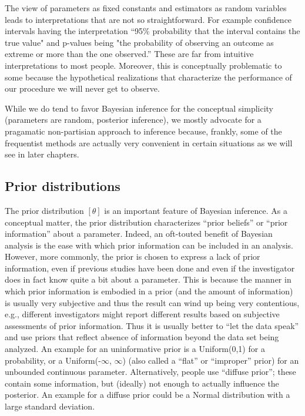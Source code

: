 The view of parameters as fixed constants and estimators as random variables
leads to interpretations that are not so straightforward. For
example confidence intervals having the interpretation ``95\%
probability that the interval contains the true value" and p-values
being "the probability of observing an outcome as extreme or more than
the one observed.'' These are far from intuitive interpretations to
most people.  Moreover, this is conceptually problematic to some
because the hypothetical realizations that characterize the
performance of our procedure we will never get to observe.

While we do tend to favor Bayesian inference for the conceptual
simplicity (parameters are random, posterior inference), we mostly
advocate for a pragamatic non-partisian approach to inference because,
frankly, some of the frequentist methods are actually very
convenient in certain situations as we will see in later chapters.


\subsection{Prior distributions}

The prior distribution $[\theta]$ is an important feature of Bayesian
inference. As a conceptual matter,
the prior distribution characterizes ``prior beliefs'' or ``prior
information'' about a parameter. Indeed,
an oft-touted benefit of Bayesian analysis is the ease with which
prior information can be included in an analysis. 
However, more commonly, the prior is chosen to
express a lack of prior information, even if previous studies have
been done and even if the investigator does in fact know quite a bit
about a parameter.
This is because
the manner in which prior information is embodied in a prior (and the
amount of information) is
usually very subjective and thus the result can wind up being very
contentious, e.g., different investigators might report different
results based on subjective assessments of prior information. Thus it is usually
better to ``let the data speak'' and use priors that reflect absence
of information beyond the data set being analyzed. An example for an uninformative prior is a Uniform(0,1) for a probability, or a Uniform(-$\infty$, $\infty$) (also called a ``flat'' or ``improper'' prior) for an unbounded continuous parameter. Alternatively, people use ``diffuse prior''; these contain some information, but (ideally) not enough to actually influence the posterior. An example for a diffuse prior could be a Normal distribution with a large standard deviation.

